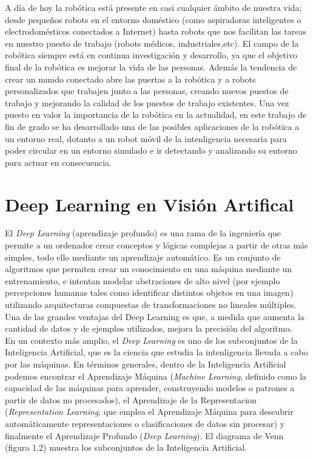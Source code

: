 \documentclass{report}
\begin{document}
A día de hoy la robótica está presente en casi cualquier ámbito de nuestra vida; desde pequeños robots en el entorno doméstico (como aspiradoras inteligentes o electrodomésticos conectados a Internet) hasta robots que nos facilitan las tareas en nuestro puesto de trabajo (robots médicos, industriales,etc). El campo de la robótica siempre está en continua investigación y desarrollo, ya que el objetivo final de la robótica es mejorar la vida de las personas. Además la tendencia de crear un mundo conectado abre las puertas a la robótica y a robots personalizados que trabajen junto a las personas, creando nuevos puestos de trabajo y mejorando la calidad de los puestos de trabajo existentes. Una vez puesto en valor la importancia de la  robótica en la actualidad, en este trabajo de fin de grado se ha desarrollado una de las posibles aplicaciones de la robótica a un entorno real, dotanto a un robot móvil de la intenligencia necesaria para poder circular en un entorno simulado e ir detectando y analizando su entorno para actuar en consecuencia.


\section{Deep Learning en Visión Artifical}

El \textit{Deep Learning} (aprendizaje profundo) es una rama de la ingeniería que permite a un ordenador crear conceptos y lógicas complejas a partir de otras más simples, todo ello mediante un aprendizaje automático. Es un conjunto de algoritmos que permiten crear un conocimiento en una máquina mediante un entrenamiento, e intentan modelar abstraciones de alto nivel (por ejemplo percepciones humanas tales como identificar distintos objetos en una imagen) utilizando arquitecturas compuestas de transformaciones no lineales múltiples. Una de las grandes ventajas del Deep Learning es que, a medida que aumenta la cantidad de datos y de ejemplos utilizados, mejora la precisión del algoritmo.
\\

En un contexto más amplio, el \textit{Deep Learning} es uno de los subconjuntos de la Inteligencia Artificial, que es la ciencia que estudia la intenligencia llevada a cabo por las máquinas. En términos generales, dentro de la Inteligencia Artificial podemos encontrar el Aprendizaje Máquina (\textit{Machine Learning}, definido como la capacidad de las máquinas para aprender, construyendo modelos o patrones a partir de datos no procesados), el Aprendizaje de la Representacion (\textit{Representation Learning}, que emplea el Aprendizaje Máquina para descubrir automáticamente representaciones o clasificaciones de datos sin procesar) y finalmente el Aprendizaje Profundo (\textit{Deep Learning}). El diagrama de Venn (figura 1.2) muestra los subconjuntos de la Inteligencia Artificial.
\\
\end{document}

